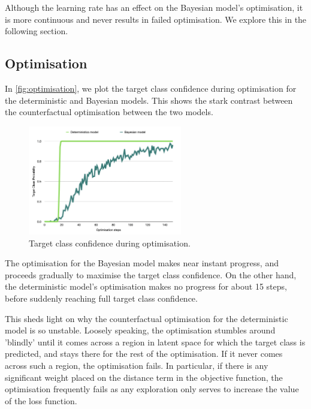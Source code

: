 \documentclass{article}
\begin{document}
Although the learning rate has an effect on the Bayesian model's optimisation, it is more continuous and never results in failed optimisation. We explore this in the following section.



\subsection{Optimisation}

In \autoref{fig:optimisation}, we plot the target class confidence during optimisation for the deterministic and Bayesian models. This shows the stark contrast between the counterfactual optimisation between the two models. 

\begin{figure}[H]
    \centering
    \includegraphics[width=0.6\textwidth]{figures/Class/Optimisation.png}
    \caption{Target class confidence during optimisation.}
    \label{fig:optimisation}
\end{figure}

The optimisation for the Bayesian model makes near instant progress, and proceeds gradually to maximise the target class confidence. On the other hand, the deterministic model's optimisation makes no progress for about 15 steps, before suddenly reaching full target class confidence. 

This sheds light on why the counterfactual optimisation for the deterministic model is so unstable. Loosely speaking, the optimisation stumbles around 'blindly' until it comes across a region in latent space for which the target class is predicted, and stays there for the rest of the optimisation. If it never comes across such a region, the optimisation fails. In particular, if there is any significant weight placed on the distance term in the objective function, the optimisation frequently fails as any exploration only serves to increase the value of the loss function. 
\end{document}
